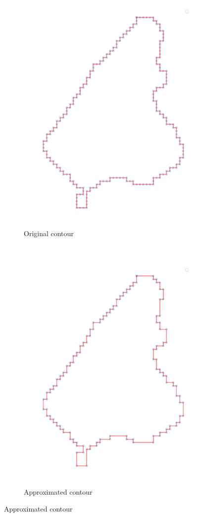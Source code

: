 \begin{figure}[H]
    \centering
	\begin{subfigure}{0.4\textwidth}
    	\includegraphics[width=0.9\linewidth]{chapters/challenges/images/original_contour.png}		    	\caption{Original contour}
	\end{subfigure}~
	\begin{subfigure}{0.4\textwidth}
    	\includegraphics[width=0.9\linewidth]{chapters/challenges/images/approx_contour.png}       			\caption{Approximated contour}

\end{subfigure}
\end{figure}
